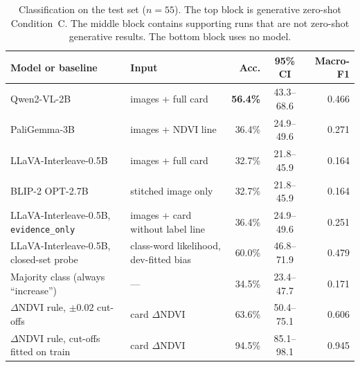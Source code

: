 \begin{table}[t]
\centering
\small
\begin{tabular}{llrcr}
\toprule
Model or baseline & Input & Acc. & 95\% CI & Macro-F1 \\
\midrule
Qwen2-VL-2B & images + full card & \textbf{56.4\%} & 43.3--68.6 & 0.466 \\
PaliGemma-3B & images + NDVI line & 36.4\% & 24.9--49.6 & 0.271 \\
LLaVA-Interleave-0.5B & images + full card & 32.7\% & 21.8--45.9 & 0.164 \\
BLIP-2 OPT-2.7B & stitched image only & 32.7\% & 21.8--45.9 & 0.164 \\
\midrule
LLaVA-Interleave-0.5B, \texttt{evidence\_only} & images + card without label line & 36.4\% & 24.9--49.6 & 0.251 \\
LLaVA-Interleave-0.5B, closed-set probe & class-word likelihood, dev-fitted bias & 60.0\% & 46.8--71.9 & 0.479 \\
\midrule
Majority class (always ``increase'') & --- & 34.5\% & 23.4--47.7 & 0.171 \\
$\Delta$NDVI rule, $\pm 0.02$ cut-offs & card $\Delta$NDVI & 63.6\% & 50.4--75.1 & 0.606 \\
$\Delta$NDVI rule, cut-offs fitted on train & card $\Delta$NDVI & 94.5\% & 85.1--98.1 & 0.945 \\
\bottomrule
\end{tabular}
\caption{Classification on the test set ($n = 55$). The top block is
generative zero-shot Condition~C. The middle block contains supporting
runs that are not zero-shot generative results. The bottom block uses no
model.}
\label{tab:zeroshot}
\end{table}
